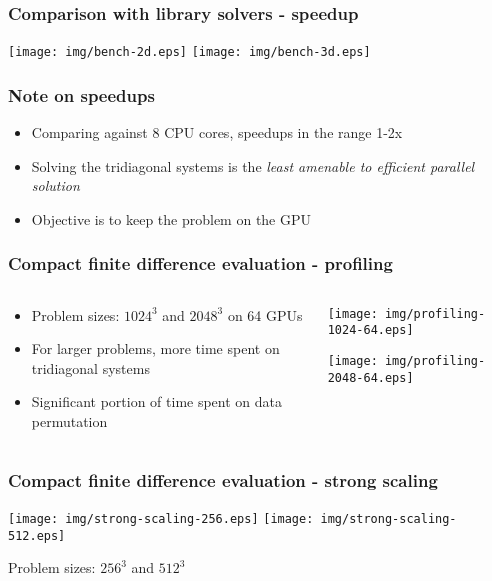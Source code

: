 \begin{frame}
\frametitle{Comparison with library solvers - speedup}
\centering
\texttt{[image: img/bench-2d.eps]}
\texttt{[image: img/bench-3d.eps]}
\begin{table}
\end{table}
\end{frame}

\begin{frame}
\frametitle{Note on speedups}
\begin{itemize}
\item Comparing against 8 CPU cores, speedups in the range 1-2x
\item Solving the tridiagonal systems
    is the \emph{least amenable to efficient parallel solution}
\item Objective is to keep the problem on the GPU
\end{itemize}
\end{frame}

\begin{frame}
\frametitle{Compact finite difference evaluation - profiling}
\begin{columns}
\begin{column}{0.5\textwidth}
\begin{itemize}
    \item Problem sizes: $1024^3$ and $2048^3$ on 64 GPUs
    \item For larger problems, more time spent
        on tridiagonal systems
    \item Significant portion of time spent on
        data permutation
\end{itemize}
\end{column}
\begin{column}{0.5\textwidth}
\centering
\texttt{[image: img/profiling-1024-64.eps]}

\texttt{[image: img/profiling-2048-64.eps]}
\end{column}
\end{columns}
\end{frame}

\begin{frame}
\frametitle{Compact finite difference evaluation - strong scaling}
\centering
\texttt{[image: img/strong-scaling-256.eps]}
\texttt{[image: img/strong-scaling-512.eps]}

Problem sizes: $256^3$ and $512^3$
\end{frame}

